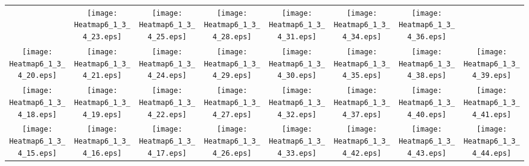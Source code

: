 \documentclass{standalone}
\begin{document}
\renewcommand{\arraystretch}{0}
\setlength{\tabcolsep}{0pt}
\begin{tabular}{ *8{c} }
 & \texttt{[image: Heatmap6\_1\_3\_4\_23.eps]} & \texttt{[image: Heatmap6\_1\_3\_4\_25.eps]} & \texttt{[image: Heatmap6\_1\_3\_4\_28.eps]} & \texttt{[image: Heatmap6\_1\_3\_4\_31.eps]} & \texttt{[image: Heatmap6\_1\_3\_4\_34.eps]} & \texttt{[image: Heatmap6\_1\_3\_4\_36.eps]} &  \\
\texttt{[image: Heatmap6\_1\_3\_4\_20.eps]} & \texttt{[image: Heatmap6\_1\_3\_4\_21.eps]} & \texttt{[image: Heatmap6\_1\_3\_4\_24.eps]} & \texttt{[image: Heatmap6\_1\_3\_4\_29.eps]} & \texttt{[image: Heatmap6\_1\_3\_4\_30.eps]} & \texttt{[image: Heatmap6\_1\_3\_4\_35.eps]} & \texttt{[image: Heatmap6\_1\_3\_4\_38.eps]} & \texttt{[image: Heatmap6\_1\_3\_4\_39.eps]} \\
\texttt{[image: Heatmap6\_1\_3\_4\_18.eps]} & \texttt{[image: Heatmap6\_1\_3\_4\_19.eps]} & \texttt{[image: Heatmap6\_1\_3\_4\_22.eps]} & \texttt{[image: Heatmap6\_1\_3\_4\_27.eps]} & \texttt{[image: Heatmap6\_1\_3\_4\_32.eps]} & \texttt{[image: Heatmap6\_1\_3\_4\_37.eps]} & \texttt{[image: Heatmap6\_1\_3\_4\_40.eps]} & \texttt{[image: Heatmap6\_1\_3\_4\_41.eps]} \\
\texttt{[image: Heatmap6\_1\_3\_4\_15.eps]} & \texttt{[image: Heatmap6\_1\_3\_4\_16.eps]} & \texttt{[image: Heatmap6\_1\_3\_4\_17.eps]} & \texttt{[image: Heatmap6\_1\_3\_4\_26.eps]} & \texttt{[image: Heatmap6\_1\_3\_4\_33.eps]} & \texttt{[image: Heatmap6\_1\_3\_4\_42.eps]} & \texttt{[image: Heatmap6\_1\_3\_4\_43.eps]} & \texttt{[image: Heatmap6\_1\_3\_4\_44.eps]} \\

\end{tabular}
\end{document}
